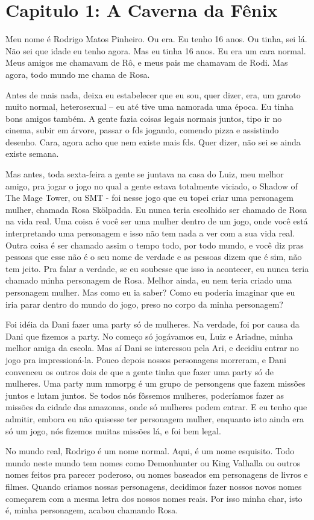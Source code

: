 \section{Capitulo 1: A Caverna da Fênix}

Meu nome é Rodrigo Matos Pinheiro. Ou era.
Eu tenho 16 anos. Ou tinha, sei lá.
Não sei que idade eu tenho agora. Mas eu tinha 16 anos.
Eu era um cara normal. Meus amigos me chamavam de Rô, e meus pais me chamavam de Rodi.
Mas agora, todo mundo me chama de Rosa.

Antes de mais nada, deixa eu estabelecer que eu sou, quer dizer, era, um garoto muito normal,
heterosexual -- eu até tive uma namorada uma época. Eu tinha bons amigos também. A gente fazia coisas
legais normais juntos, tipo ir no cinema, subir em árvore, passar o fds jogando, comendo pizza e assistindo desenho.
Cara, agora acho que nem existe mais fds. Quer dizer, não sei se ainda existe semana.

Mas antes, toda sexta-feira a gente se juntava na casa do Luiz, meu melhor amigo, pra jogar o jogo no qual a
gente estava totalmente viciado, o Shadow of The Mage Tower, ou SMT - foi nesse jogo que eu topei criar uma personagem mulher,
chamada Rosa Skölpadda. Eu nunca teria escolhido ser chamado de Rosa na vida real.
Uma coisa é você ser uma mulher dentro de um jogo, onde você está interpretando uma personagem e isso
não tem nada a ver com a sua vida real. Outra coisa é ser chamado assim o tempo todo, por todo mundo,
e você diz pras pessoas que esse não é o seu nome de verdade e as pessoas dizem que é sim, não tem jeito.
Pra falar a verdade, se eu soubesse que isso ia acontecer, eu nunca teria chamado minha personagem de Rosa.
Melhor ainda, eu nem teria criado uma personagem mulher. Mas como eu ia saber?
Como eu poderia imaginar que eu iria parar dentro do mundo do jogo, preso no corpo da minha personagem?

Foi idéia da Dani fazer uma party só de mulheres. Na verdade, foi por causa da Dani que fizemos a party.
No começo só jogávamos eu, Luiz e Ariadne, minha melhor amiga da escola. Mas aí Dani se interessou pela Ari,
e decidiu entrar no jogo pra impressioná-la. Pouco depois nossos personagens morreram, e Dani convenceu os
outros dois de que a gente tinha que fazer uma party só de mulheres. Uma party num mmorpg é um grupo de persongens
que fazem missões juntos e lutam juntos. Se todos nós fôssemos
mulheres, poderíamos fazer as missões da cidade das amazonas, onde só mulheres podem entrar. E eu tenho que admitir,
embora eu não quisesse ter personagem mulher, enquanto
isto ainda era só um jogo, nós fizemos muitas missões lá, e foi bem legal.

No mundo real, Rodrigo é um nome normal. Aqui, é um nome esquisito. Todo mundo neste mundo tem nomes como
Demonhunter ou King Valhalla ou outros nomes feitos pra parecer poderoso, ou nomes baseados em personagens de
livros e filmes. Quando criamos nossas personagens, decidimos fazer nossos novos nomes começarem com a mesma letra
dos nossos nomes reais. Por isso minha char, isto é, minha personagem, acabou chamando Rosa. 

